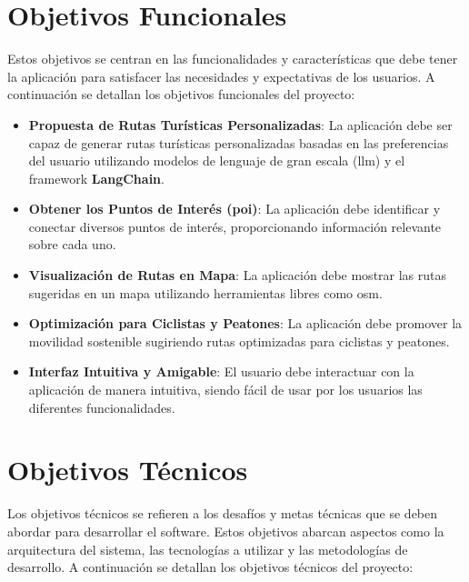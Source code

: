 
\section{Objetivos Funcionales}

Estos objetivos se centran en las funcionalidades y características que debe tener la aplicación para satisfacer las necesidades y expectativas de los usuarios. A continuación se detallan los objetivos funcionales del proyecto:

\begin{itemize}
    \item \textbf{Propuesta de Rutas Turísticas Personalizadas}: La aplicación debe ser capaz de generar rutas turísticas personalizadas basadas en las preferencias del usuario utilizando modelos de lenguaje de gran escala (\acrfull{llm}) y el framework \textbf{LangChain}.
    \item \textbf{Obtener los Puntos de Interés (\acrfull{poi})}: La aplicación debe identificar y conectar diversos puntos de interés, proporcionando información relevante sobre cada uno.
    \item \textbf{Visualización de Rutas en Mapa}: La aplicación debe mostrar las rutas sugeridas en un mapa utilizando herramientas libres como \acrfull{osm}.
    \item \textbf{Optimización para Ciclistas y Peatones}: La aplicación debe promover la movilidad sostenible sugiriendo rutas optimizadas para ciclistas y peatones.
    \item \textbf{Interfaz Intuitiva y Amigable}: El usuario debe interactuar con la aplicación de manera intuitiva, siendo fácil de usar por los usuarios las diferentes funcionalidades.
\end{itemize}

\section{Objetivos Técnicos}

Los objetivos técnicos se refieren a los desafíos y metas técnicas que se deben abordar para desarrollar el software. Estos objetivos abarcan aspectos como la arquitectura del sistema, las tecnologías a utilizar y las metodologías de desarrollo. A continuación se detallan los objetivos técnicos del proyecto:

